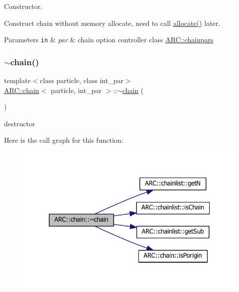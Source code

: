 Constructor. 

Construct chain without memory allocate, need to call \hyperlink{classARC_1_1chain_a0c3c1daffa75873b39d9964eebc6566f}{allocate()} later. 
\begin{DoxyParams}[1]{Parameters}
\mbox{\tt in}  & {\em par} & chain option controller class \hyperlink{classARC_1_1chainpars}{A\+R\+C\+::chainpars} \\
\hline
\end{DoxyParams}
\hypertarget{classARC_1_1chain_a4e9c6711eb95c5614cd28b14d33ec3eb}{}\label{classARC_1_1chain_a4e9c6711eb95c5614cd28b14d33ec3eb} 
\subsubsection{\texorpdfstring{$\sim$chain()}{~chain()}}
{\footnotesize\ttfamily template$<$class particle, class int\+\_\+par$>$ \\
\hyperlink{classARC_1_1chain}{A\+R\+C\+::chain}$<$ particle, int\+\_\+par $>$\+::$\sim$\hyperlink{classARC_1_1chain}{chain} (\begin{DoxyParamCaption}{ }\end{DoxyParamCaption})\hspace{0.3cm}{\ttfamily [inline]}}



destructor 

Here is the call graph for this function\+:
\nopagebreak
\begin{figure}[H]
\begin{center}
\leavevmode
\includegraphics[width=332pt]{classARC_1_1chain_a4e9c6711eb95c5614cd28b14d33ec3eb_cgraph}
\end{center}
\end{figure}


